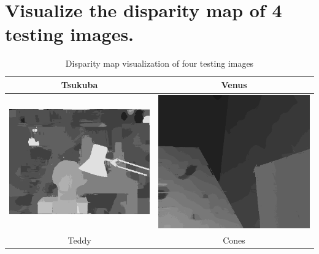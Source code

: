 \documentclass[a4paper, 12pt]{article}
\begin{document}
\section{Visualize the disparity map of 4 testing images.}
\begin{table}[!htb]
    \centering
    \caption{Disparity map visualization of four testing images}
    \begin{tabular}{|c|c|}
        \hline
        Tsukuba                                    & Venus                                    \\
        \hline
        \includegraphics[scale=0.5]{./Tsukuba.png} & \includegraphics[scale=0.5]{./Venus.png} \\
        \hline
        Teddy                                      & Cones                                    \\
        \hline

\end{tabular}
\end{table}
\end{document}
